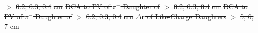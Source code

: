 \documentclass[ALICE,manyauthors]{cernphprep}
\newcommand{\Ks}{$\mathrm{K^{0}_{S}}$\xspace}
\providecommand{\DIFdeltex}[1]{{\protect\color{red}\sout{#1}}}                      %
\providecommand{\DIFdelFL}[1]{\DIFdel{#1}} %
\providecommand{\DIFdel}[1]{\texorpdfstring{\DIFdeltex{#1}}{}} %
\begin{document}
\DIFdelFL{$>$ }%
\DIFdelFL{0.2, 0.3, 0.4}%
\DIFdelFL{cm }%
\DIFdelFL{DCA to PV of $\pi^{+}$ Daughter of }%
\DIFdelFL{$>$ }%
\DIFdelFL{0.2, 0.3, 0.4}%
\DIFdelFL{cm }%
\DIFdelFL{DCA to PV of $\pi^{-}$ Daughter of }%
\DIFdelFL{$>$ }%
\DIFdelFL{0.2, 0.3, 0.4}%
\DIFdelFL{cm }%
\DIFdelFL{$\overline{\Delta\mathbf{r}}$ of Like-Charge Daughters }%
\DIFdelFL{$>$ }%
\DIFdelFL{5, 6, 7}%
\DIFdelFL{cm }%
\end{document}
